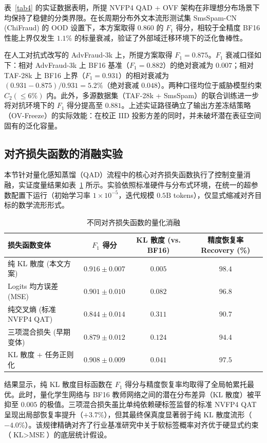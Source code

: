 \documentclass[11pt, a4paper]{article}
\begin{document}
表~\ref{tab4} 的实证数据表明，所提 NVFP4 QAD + OVF 架构在非理想分布场景下均保持了稳健的分类界限。在长周期分布外文本流形测试集 SmsSpam-CN (ChiFraud) 的 OOD 设置下，本方案取得 $0.860$ 的 $F_1$ 得分，相较于全精度 BF16 性能上界仅发生 $1.1\%$ 的标量衰减，验证了外部域迁移环境下的泛化鲁棒性。

在人工对抗式改写的 AdvFraud-3k 上，所提方案取得 $F_1=0.875$。$F_1$ 衰减口径如下：相对 AdvFraud-3k 上 BF16 基准（$F_1=0.882$）的绝对衰减为 $0.007$；相对 TAF-28k 上 BF16 上界（$F_1=0.931$）的相对衰减为 $(0.931-0.875)/0.931 = 5.2\%$（绝对衰减 $0.048$）。两种口径均位于威胁模型约束 $C_2(\le 6\%)$ 内。此外，多源数据集（TAF-28k + SmsSpam）的联合训练进一步将对抗环境下的 $F_1$ 得分提高至 $0.881$。上述实证路径确立了输出方差冻结策略（OV-Freeze）的实际效能：在校正 IID 投影方差的同时，并未破坏潜在表征空间固有的泛化容量。

\subsection{对齐损失函数的消融实验}

本节针对量化感知蒸馏（QAD）流程中的核心对齐损失函数执行了控制变量消融，实证度量结果如表~\ref{tab5} 所示。实验依照标准硬件与分布式环境，在统一的超参数配置下运行（初始学习率 $1 \times 10^{-5}$，迭代规模 $0.5\text{B}$ tokens），仅显式缩减对齐目标的数学流形形式。

\begin{table}[htbp]
\centering
\caption{不同对齐损失函数的量化消融}
\label{tab5}
\small
\renewcommand{\arraystretch}{1.25}
\begin{tabular}{lccc}
\toprule
\textbf{损失函数变体} & \textbf{$F_1$ 得分} & \textbf{KL 散度 (vs. BF16)} & \textbf{精度恢复率 Recovery (\%)} \\
\midrule
纯 KL 散度 (本文方案) & $\mathbf{0.916 \pm 0.007}$ & $\mathbf{0.005}$ & $\mathbf{98.4}$ \\
Logits 均方误差 (MSE) & $0.901 \pm 0.010$ & $0.082$ & $96.8$ \\
纯交叉熵 (标准 NVFP4 QAT) & $0.844 \pm 0.014$ & $0.311$ & $90.7$ \\
三项混合损失 (早期变体) & $0.879 \pm 0.012$ & $0.124$ & $94.4$ \\
KL 散度 + 任务正则化 & $0.908 \pm 0.009$ & $0.041$ & $97.5$ \\
\bottomrule
\end{tabular}
\end{table}

结果显示，纯 KL 散度目标函数在 $F_1$ 得分与精度恢复率均取得了全局帕累托最优。此时，量化学生网络与 BF16 教师网络之间的潜在分布差异（KL 散度）被平抑至 $0.005$ 的极值。三项混合损失虽比单纯依赖硬标签监督的标准 NVFP4 QAT 呈现出局部恢复率提升（$+3.7\%$），但其最终保真度显著弱于纯 KL 散度流形（$-4.0\%$）。该规律精确对齐了行业基准研究中关于软标签概率对齐优于硬显式约束（$\text{KL} > \text{MSE}$）的底层统计假设。
\end{document}
